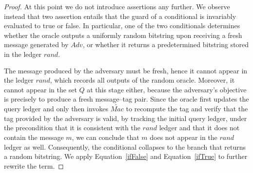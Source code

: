 \begin{proof}
\normalsize

At this point we do not introduce assertions any further. We observe instead that two assertion entails that the guard of a conditional is invariably evaluated to true or false. In particular, one of the two conditionals determines whether the oracle outputs a uniformly random bitstring upon receiving a fresh message generated by $Adv$, or whether it returns a predetermined bitstring stored in the ledger $rand$. 

The message produced by the adversary must be fresh, hence it cannot appear in the ledger $rand$, which records all outputs of the random oracle. Moreover, it cannot appear in the set $Q$ at this stage either, because the adversary's objective is precisely to produce a fresh message–tag pair. Since the oracle first updates the query ledger and only then invokes $\widetilde{Mac}$ to recompute the tag and verify that the tag provided by the adversary is valid, by tracking the initial query ledger, under the precondition that it is consistent with the $rand$ ledger and that it does not contain the message $m$, we can conclude that $m$ does not appear in the $rand$ ledger as well. Consequently, the conditional collapses to the branch that returns a random bitstring. We apply Equation~\ref{ifFalse} and Equation~\ref{ifTrue} to further rewrite the term.


\end{proof}
